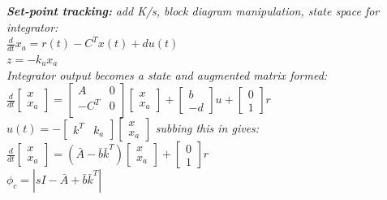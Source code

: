 \documentclass[a4paper, 10pt, titlepage]{article}
\begin{document}
\begin{paracol}{3}[]
\textit{\textbf{Set-point tracking:}} \textit{add K/s, block diagram manipulation, state space for integrator:} \\
$\frac{d}{dt}x_a = r(t) - C^Tx(t) +du(t)$ \\
$z=-k_ax_a$ \\
\textit{Integrator output becomes a state and augmented matrix formed:} \\
$\frac{d}{dt}
\begin{bmatrix}
x\\x_a
\end{bmatrix}
= 
\begin{bmatrix}
A & 0\\
-C^T & 0\\
\end{bmatrix}
\begin{bmatrix}
x\\x_a
\end{bmatrix}
+
\begin{bmatrix}
b\\-d
\end{bmatrix}
u
+
\begin{bmatrix}
0\\1
\end{bmatrix}
r
$\\
$u(t) = -\begin{bmatrix}
k^T & k_a
\end{bmatrix}
\begin{bmatrix}
x \\ x_a
\end{bmatrix}$
\textit{subbing this in gives:} \\
$\frac{d}{dt}
\begin{bmatrix}
x\\x_a
\end{bmatrix} =
(\bar{A} - \bar{b}\bar{k}^T) \begin{bmatrix}
x \\ x_a
\end{bmatrix}
+ \begin{bmatrix}
0 \\ 1
\end{bmatrix} r$ \\
$\phi_c = |sI-\bar{A} + \bar{b}\bar{k}^T|$ \\


\end{paracol}
\end{document}
